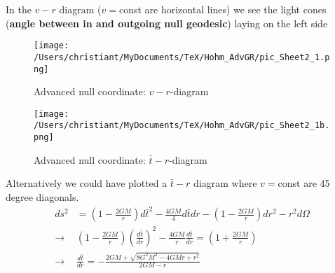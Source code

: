 \documentclass[10pt,a4paper]{article}
\theoremstyle{definition}
\begin{document}
\begin{enumerate}
In the $v-r$ diagram ($v=$const are horizontal lines) we see the light cones ({\bf angle between in and outgoing null geodesic}) laying on the left side 
\begin{figure}[!h]
\centering
\texttt{[image: /Users/christiant/MyDocuments/TeX/Hohm\_AdvGR/pic\_Sheet2\_1.png]}
\caption{Advanced null coordinate: $v-r$-diagram }
\end{figure}

\begin{figure}[!h]
\centering
\texttt{[image: /Users/christiant/MyDocuments/TeX/Hohm\_AdvGR/pic\_Sheet2\_1b.png]}
\caption{Advanced null coordinate: $\bar{t}-r$-diagram }
\end{figure}

Alternatively we could have plotted a $\bar{t}-r$ diagram where $v=$const are 45 degree diagonals.
\begin{align}
ds^2&=\left(1-\frac{2GM}{r}\right)d\bar{t}^2-\frac{4GM}{4}d\bar{t}dr-\left(1-\frac{2GM}{r}\right)dr^2-r^2d\Omega\\
\rightarrow& \left(1-\frac{2GM}{r}\right)\left(\frac{d\bar{t}}{dr}\right)^2-\frac{4G M}{r}\frac{d\bar{t}}{dr}=\left(1+\frac{2GM}{r}\right)\\
\rightarrow& \frac{d\bar{t}}{dr}=-\frac{2GM+\sqrt{8G^2M^2-4GMr+r^2}}{2GM-r}
\end{align}


\end{enumerate}
\end{document}
